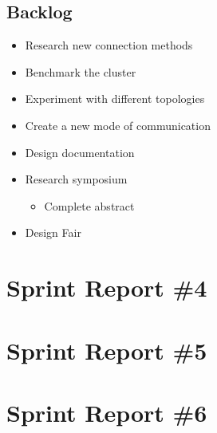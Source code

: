 \subsection*{Backlog}
\begin{itemize}
	\item Research new connection methods
	\item Benchmark the cluster
	\item Experiment with different topologies
	\item Create a new mode of communication
	\item Design documentation
	\item Research symposium
	\begin{itemize}
		\item Complete abstract
	\end{itemize}
	\item Design Fair
\end{itemize}

\section{Sprint Report \#4}

\section{Sprint Report \#5}

\section{Sprint Report \#6}